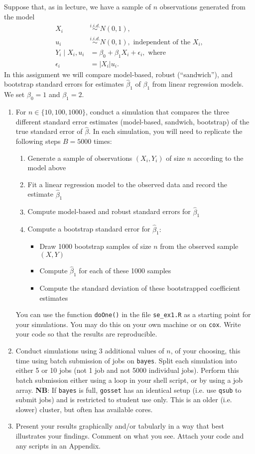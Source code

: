 \documentclass{article}
\newcommand{\abs}[1]{\left\lvert#1\right\rvert}
\begin{document}
Suppose that, as in lecture, we have a sample of $n$ observations generated from the model
\begin{align*}
X_i &\stackrel{i.i.d.}{\sim} N(0, 1), \\
u_i &\stackrel{i.i.d.}{\sim} N(0, 1), \text{ independent of the } X_i, \\
Y_i \mid X_i, u_i &= \beta_0 + \beta_1 X_i + \epsilon_i, \text{ where} \\
\epsilon_i &= \abs{X_i}u_i.
\end{align*}
In this assignment we will compare model-based, robust (``sandwich''), and bootstrap standard errors for estimates $\hat{\beta}_1$ of $\beta_1$ from linear regression models. We set $\beta_0 = 1$ and $\beta_1 = 2$.
\begin{enumerate}
\item For $n \in \{10, 100, 1000\}$, conduct a simulation that compares the three different standard error estimates (model-based, sandwich, bootstrap) of the true standard error of $\hat{\beta}$. In each simulation, you will need to replicate the following steps $B = 5000$ times:
\begin{enumerate}
\item Generate a sample of observations $(X_i, Y_i)$ of size $n$ according to the model above
\item Fit a linear regression model to the observed data and record the estimate $\hat{\beta}_1$
\item Compute model-based and robust standard errors for $\hat{\beta}_1$
\item Compute a bootstrap standard error for $\hat{\beta}_1:$ 
\begin{itemize}
\item Draw 1000 bootstrap samples of size $n$ from the observed sample $(X, Y)$
\item Compute $\hat{\beta}_1$ for each of these 1000 samples
\item Compute the standard deviation of these bootstrapped coefficient estimates
\end{itemize}
\end{enumerate}
You can use the function \texttt{doOne()} in the file \texttt{se\_ex1.R} as a starting point for your simulations. You may do this on your own machine or on \texttt{cox}. Write your code so that the results are reproducible.

\item Conduct simulations using 3 additional values of $n$, of your choosing, this time using batch submission of jobs on \texttt{bayes}. Split each simulation into either 5 or 10 jobs (not 1 job and not 5000 individual jobs). Perform this batch submission either using a loop in your shell script, or by using a job array. \textbf{NB}: If \texttt{bayes} is full, \texttt{gosset} has an identical setup (i.e. use \texttt{qsub} to submit jobs) and is restricted to student use only. This is an older (i.e. slower) cluster, but often has available cores.

\item Present your results graphically and/or tabularly in a way that best illustrates your findings. Comment on what you see. Attach your code and any scripts in an Appendix.
\end{enumerate}
\end{document}
